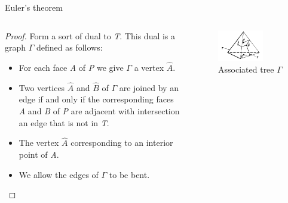 \documentclass{beamer}
\begin{document}
\begin{frame}{Euler's theorem}
  \begin{columns}
    \begin{column}{0.6\textwidth}
      \begin{proof}
        Form a sort of dual to \textsl{T}. This dual is a graph $\Gamma$ defined as follows:
        \begin{itemize}
        \item For each face \textsl{A} of \textsl{P} we give $\Gamma$ a vertex $\hat A$.
        \item Two vertices $\hat A$ and $\hat B$ of $\Gamma$ are joined by an edge if and only if the corresponding faces \textsl{A} and \textsl{B} of \textsl{P} are adjacent with intersection an edge that is not in \textsl{T}.
        \item The vertex $\hat A$ corresponding to an interior point of \textsl{A}.
        \item We allow the edges of $\Gamma$ to be bent.
        \end{itemize}
      \end{proof}
    \end{column}
    \begin{column}{0.4\textwidth}
      \begin{figure}
        \centering
        \includegraphics[width=0.7\textwidth]{figure_1_5_c.png}
        \caption{Associated tree $\Gamma$}
      \end{figure}
    \end{column}
  \end{columns}
\end{frame}
\end{document}
